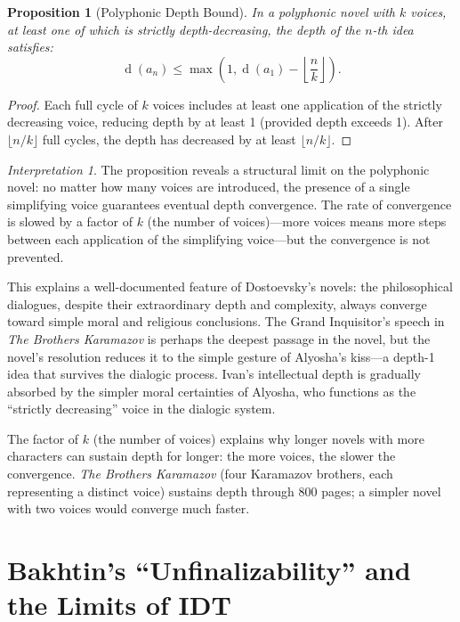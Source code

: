 \documentclass[11pt,openany]{book}
\theoremstyle{definition}
\theoremstyle{plain}
\newtheorem{proposition}[axiom]{Proposition}
\theoremstyle{remark}
\newtheorem{interpretation}[axiom]{Interpretation}
\newcommand{\depth}{\operatorname{d}}       %
\begin{document}
\begin{proposition}[Polyphonic Depth Bound]
In a polyphonic novel with $k$ voices, at least one of which is strictly depth-decreasing, the depth of the $n$-th idea satisfies:
\[
\depth(a_n) \leq \max\left(1, \depth(a_1) - \left\lfloor \frac{n}{k} \right\rfloor\right).
\]
\end{proposition}

\begin{proof}
Each full cycle of $k$ voices includes at least one application of the strictly decreasing voice, reducing depth by at least 1 (provided depth exceeds 1). After $\lfloor n/k \rfloor$ full cycles, the depth has decreased by at least $\lfloor n/k \rfloor$.
\end{proof}

\begin{interpretation}
The proposition reveals a structural limit on the polyphonic novel: no matter how many voices are introduced, the presence of a single simplifying voice guarantees eventual depth convergence. The rate of convergence is slowed by a factor of $k$ (the number of voices)---more voices means more steps between each application of the simplifying voice---but the convergence is not prevented.

This explains a well-documented feature of Dostoevsky's novels: the philosophical dialogues, despite their extraordinary depth and complexity, always converge toward simple moral and religious conclusions. The Grand Inquisitor's speech in \emph{The Brothers Karamazov} is perhaps the deepest passage in the novel, but the novel's resolution reduces it to the simple gesture of Alyosha's kiss---a depth-1 idea that survives the dialogic process. Ivan's intellectual depth is gradually absorbed by the simpler moral certainties of Alyosha, who functions as the ``strictly decreasing'' voice in the dialogic system.

The factor of $k$ (the number of voices) explains why longer novels with more characters can sustain depth for longer: the more voices, the slower the convergence. \emph{The Brothers Karamazov} (four Karamazov brothers, each representing a distinct voice) sustains depth through 800 pages; a simpler novel with two voices would converge much faster.
\end{interpretation}

\section{Bakhtin's ``Unfinalizability'' and the Limits of IDT}
\end{document}
